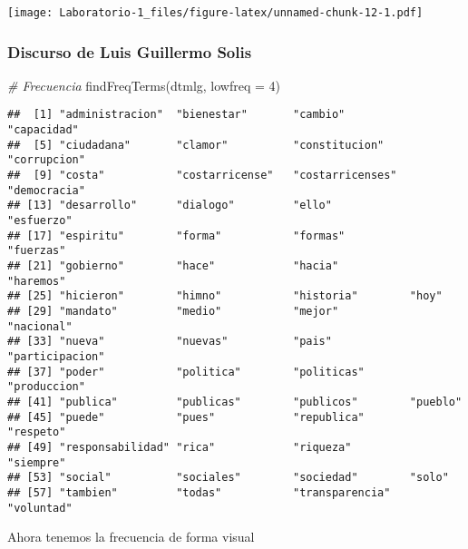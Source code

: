 \documentclass[
]{article}
\newenvironment{Shaded}{\begin{snugshade}}{\end{snugshade}}
\newcommand{\AttributeTok}[1]{\textcolor[rgb]{0.77,0.63,0.00}{#1}}
\newcommand{\CommentTok}[1]{\textcolor[rgb]{0.56,0.35,0.01}{\textit{#1}}}
\newcommand{\DecValTok}[1]{\textcolor[rgb]{0.00,0.00,0.81}{#1}}
\newcommand{\FunctionTok}[1]{\textcolor[rgb]{0.00,0.00,0.00}{#1}}
\newcommand{\NormalTok}[1]{#1}
\newcommand{\OtherTok}[1]{\textcolor[rgb]{0.56,0.35,0.01}{#1}}
\newcommand{\SpecialCharTok}[1]{\textcolor[rgb]{0.00,0.00,0.00}{#1}}
\newcommand{\StringTok}[1]{\textcolor[rgb]{0.31,0.60,0.02}{#1}}
\begin{document}
\texttt{[image: Laboratorio-1\_files/figure-latex/unnamed-chunk-12-1.pdf]}

\hypertarget{discurso-de-luis-guillermo-solis-1}{%
\subsubsection{Discurso de Luis Guillermo
Solis}\label{discurso-de-luis-guillermo-solis-1}}

\begin{Shaded}
\begin{Highlighting}[]
\CommentTok{\# Frecuencia}
\FunctionTok{findFreqTerms}\NormalTok{(dtmlg, }\AttributeTok{lowfreq =} \DecValTok{4}\NormalTok{)}
\end{Highlighting}
\end{Shaded}

\begin{verbatim}
##  [1] "administracion"  "bienestar"       "cambio"          "capacidad"      
##  [5] "ciudadana"       "clamor"          "constitucion"    "corrupcion"     
##  [9] "costa"           "costarricense"   "costarricenses"  "democracia"     
## [13] "desarrollo"      "dialogo"         "ello"            "esfuerzo"       
## [17] "espiritu"        "forma"           "formas"          "fuerzas"        
## [21] "gobierno"        "hace"            "hacia"           "haremos"        
## [25] "hicieron"        "himno"           "historia"        "hoy"            
## [29] "mandato"         "medio"           "mejor"           "nacional"       
## [33] "nueva"           "nuevas"          "pais"            "participacion"  
## [37] "poder"           "politica"        "politicas"       "produccion"     
## [41] "publica"         "publicas"        "publicos"        "pueblo"         
## [45] "puede"           "pues"            "republica"       "respeto"        
## [49] "responsabilidad" "rica"            "riqueza"         "siempre"        
## [53] "social"          "sociales"        "sociedad"        "solo"           
## [57] "tambien"         "todas"           "transparencia"   "voluntad"
\end{verbatim}

Ahora tenemos la frecuencia de forma visual

\begin{Shaded}
\end{Shaded}
\end{document}
